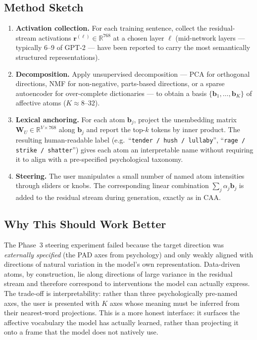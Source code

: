 \documentclass[12pt,twoside]{report}
\begin{document}
\subsection{Method Sketch}

\begin{enumerate}
    \item \textbf{Activation collection.} For each training sentence, collect the residual-stream activations $\mathbf{r}^{(\ell)} \in \mathbb{R}^{768}$ at a chosen layer $\ell$ (mid-network layers --- typically 6--9 of GPT-2 --- have been reported to carry the most semantically structured representations).
    \item \textbf{Decomposition.} Apply unsupervised decomposition --- PCA for orthogonal directions, NMF for non-negative, parts-based directions, or a sparse autoencoder for over-complete dictionaries --- to obtain a basis $\{\mathbf{b}_1, \dots, \mathbf{b}_K\}$ of affective atoms ($K \approx 8$--$32$).
    \item \textbf{Lexical anchoring.} For each atom $\mathbf{b}_j$, project the unembedding matrix $\mathbf{W}_U \in \mathbb{R}^{V \times 768}$ along $\mathbf{b}_j$ and report the top-$k$ tokens by inner product. The resulting human-readable label (e.g.\ ``\texttt{tender / hush / lullaby}'', ``\texttt{rage / strike / shatter}'') gives each atom an interpretable name without requiring it to align with a pre-specified psychological taxonomy.
    \item \textbf{Steering.} The user manipulates a small number of named atom intensities through sliders or knobs. The corresponding linear combination $\sum_j \alpha_j \mathbf{b}_j$ is added to the residual stream during generation, exactly as in CAA.
\end{enumerate}

\subsection{Why This Should Work Better}

The Phase~3 steering experiment failed because the target direction was \emph{externally specified} (the PAD axes from psychology) and only weakly aligned with directions of natural variation in the model's own representation.
Data-driven atoms, by construction, lie along directions of large variance in the residual stream and therefore correspond to interventions the model can actually express.
The trade-off is interpretability: rather than three psychologically pre-named axes, the user is presented with $K$ axes whose meaning must be inferred from their nearest-word projections.
This is a more honest interface: it surfaces the affective vocabulary the model has actually learned, rather than projecting it onto a frame that the model does not natively use.
\end{document}
